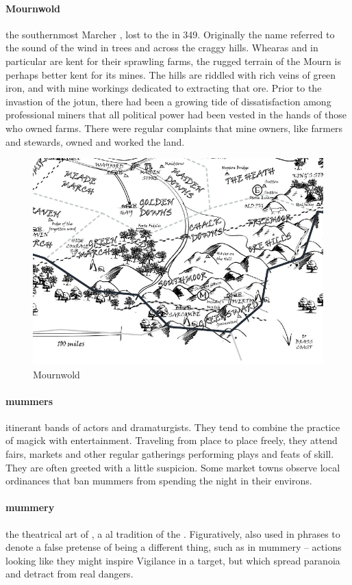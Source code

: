 \paragraph{Mournwold} the southernmost Marcher , lost to the  in 349. Originally the name referred to the sound of the wind in trees and across the craggy hills. Whearas  and  in particular are kent for their sprawling farms, the rugged terrain of the Mourn is perhaps better kent for its mines. The hills are riddled with rich veins of green iron, and with mine workings dedicated to extracting that ore. Prior to the invastion of the jotun, there had been a growing tide of dissatisfaction among professional miners that all political power had been vested in the hands of those who owned farms. There were regular complaints that mine owners, like farmers and stewards, owned and worked the land.\begin{figure}\centering\includegraphics[width=16.3cm,angle=90]{atlasofthemarches/Mournwold}\caption{Mournwold}\end{figure}
\paragraph{mummers} itinerant bands of actors and dramaturgists. They tend to combine the practice of  magick with entertainment. Traveling from place to place freely, they attend fairs, markets and other regular gatherings performing plays and feats of skill. They are often greeted with a little suspicion. Some market towns observe local ordinances that ban mummers from spending the night in their environs.
\paragraph{mummery} the theatrical art of , a al tradition of the . Figuratively, also used in phrases to denote a false pretense of being a different thing, such as in  mummery – actions looking like they might inspire Vigilance in a target, but which spread paranoia and detract from real dangers.
